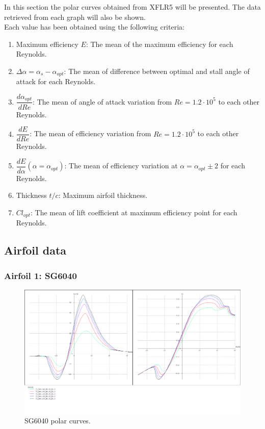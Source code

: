 \documentclass[../TFG_Annex.tex]{subfiles}
\begin{document}
In this section the polar curves obtained from XFLR5 will be presented. The data retrieved from each graph will also be shown. \\

Each value has been obtained using the following criteria: 

\begin{enumerate}
	
\item Maximum efficiency $E$: The mean of the maximum efficiency for each Reynolds.

\item $\Delta \alpha=\alpha_{s}-\alpha_{opt}$: The mean of difference between optimal and stall angle of attack for each Reynolds.

\item $\dfrac{d\alpha_{opt}}{dRe}$: The mean of angle of attack variation from $Re=1.2\cdot10^5$ to each other Reynolds. 

\item $\dfrac{dE}{dRe}$: The mean of efficiency variation from $Re=1.2\cdot10^5$ to each other Reynolds. 

\item $\dfrac{dE}{d \alpha} (\alpha=\alpha_{opt})$: The mean of efficiency variation at $\alpha = \alpha_{opt} \pm 2$ for each Reynolds. 

\item Thickness $t/c$: Maximum airfoil thickness.

\item $Cl_{opt}$: The mean of lift coefficient at maximum efficiency point for each Reynolds. 

\end{enumerate}


\newpage

\subsection{Airfoil data}

\subsubsection{Airfoil 1: SG6040}

\begin{figure}[h!]
	\centering
	\includegraphics[width=1\linewidth]{"../../04-Airfoil selection/Imatges airfoils/1-SG6040"}
	\caption{SG6040 polar curves.}
	\label{fig:1-sg6040}
\end{figure}
\end{document}
